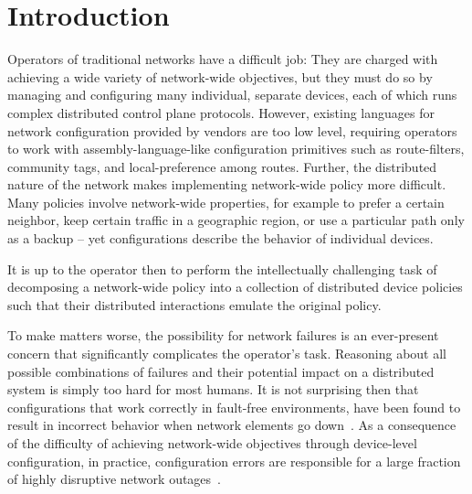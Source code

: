 \documentclass[sigchi]{acmart}
\begin{document}
\maketitle


\section{Introduction}

Operators of traditional networks have a difficult job: They are charged
with achieving a wide variety of network-wide objectives, but they must do so by
managing and configuring many individual, separate devices, each of which runs
complex distributed control plane protocols. However, existing languages
for network configuration provided by vendors are too low level, requiring operators to work with assembly-language-like configuration primitives such as route-filters, community tags, and local-preference among routes. Further, the distributed nature of the network makes implementing network-wide policy more difficult. Many policies involve network-wide properties, for example to prefer a certain neighbor, keep certain traffic in a geographic region, or use a particular path only as a backup -- yet configurations describe the behavior of individual devices.

%
It is up to the operator then to perform the intellectually challenging task of decomposing a network-wide policy into a collection of distributed device policies such that their distributed interactions emulate the original policy.

To make matters worse, the possibility for network failures is an 
ever-present concern that significantly complicates the operator's task. 
Reasoning about all possible combinations of failures
and their potential impact on a distributed system is simply too hard for most humans. 
It is not surprising then that configurations that work correctly in fault-free 
environments, have been found to result in incorrect behavior when network 
elements go down~\cite{batfish}.
%
%
As a consequence of the difficulty of achieving network-wide objectives through device-level configuration, in practice, configuration errors are responsible for a large fraction of highly disruptive network outages~\cite{juniper-study,yankee-study,mahajan+:bgp-misconfiguration,feamster+:rcc,batfish,dc-failure-study,time-warner}.

\end{document}
